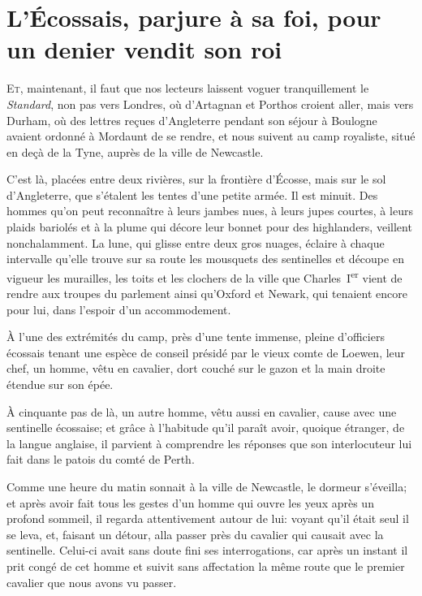 \chapter[L'Écossais vendit son roi]{L'Écossais, parjure à sa foi, pour un denier vendit son roi}

\lettrine{E}{t,} maintenant, il faut que nos lecteurs laissent voguer tranquillement le \textit{Standard}, non pas vers Londres, où d'Artagnan et Porthos croient aller, mais vers Durham, où des lettres reçues d'Angleterre pendant son séjour à Boulogne avaient ordonné à Mordaunt de se rendre, et nous suivent au camp royaliste, situé en deçà de la Tyne, auprès de la ville de Newcastle.

C'est là, placées entre deux rivières, sur la frontière d'Écosse, mais sur le sol d'Angleterre, que s'étalent les tentes d'une petite armée. Il est minuit. Des hommes qu'on peut reconnaître à leurs jambes nues, à leurs jupes courtes, à leurs plaids bariolés et à la plume qui décore leur bonnet pour des highlanders, veillent nonchalamment. La lune, qui glisse entre deux gros nuages, éclaire à chaque intervalle qu'elle trouve sur sa route les mousquets des sentinelles et découpe en vigueur les murailles, les toits et les clochers de la ville que Charles~I\textsuperscript{er} vient de rendre aux troupes du parlement ainsi qu'Oxford et Newark, qui tenaient encore pour lui, dans l'espoir d'un accommodement.

À l'une des extrémités du camp, près d'une tente immense, pleine d'officiers écossais tenant une espèce de conseil présidé par le vieux comte de Loewen, leur chef, un homme, vêtu en cavalier, dort couché sur le gazon et la main droite étendue sur son épée.

À cinquante pas de là, un autre homme, vêtu aussi en cavalier, cause avec une sentinelle écossaise; et grâce à l'habitude qu'il paraît avoir, quoique étranger, de la langue anglaise, il parvient à comprendre les réponses que son interlocuteur lui fait dans le patois du comté de Perth.

Comme une heure du matin sonnait à la ville de Newcastle, le dormeur s'éveilla; et après avoir fait tous les gestes d'un homme qui ouvre les yeux après un profond sommeil, il regarda attentivement autour de lui: voyant qu'il était seul il se leva, et, faisant un détour, alla passer près du cavalier qui causait avec la sentinelle. Celui-ci avait sans doute fini ses interrogations, car après un instant il prit congé de cet homme et suivit sans affectation la même route que le premier cavalier que nous avons vu passer.

